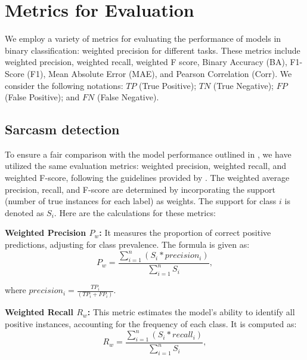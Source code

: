 \documentclass{article} %
\begin{document}

\section{Metrics for Evaluation}
We employ a variety of metrics for evaluating the performance of models in binary classification: weighted precision for different tasks. These metrics include weighted precision, weighted recall, weighted F score, Binary Accuracy (BA), F1-Score (F1), Mean Absolute Error (MAE), and Pearson Correlation (Corr). We consider the following notations: $TP$ (True Positive); $TN$ (True Negative); $FP$ (False Positive); and $FN$ (False Negative).


\subsection{Sarcasm detection}
To ensure a fair comparison with the model performance outlined in \citep{castro2019towards}, we have utilized the same evaluation metrics: weighted precision, weighted recall, and weighted F-score, following the guidelines provided by \citep{castro2019towards}. The weighted average precision, recall, and F-score are determined by incorporating the support (number of true instances for each label) as weights. The support for class $i$ is denoted as $S_i$. Here are the calculations for these metrics:

\textbf{Weighted Precision $P_w$:}  It measures the proportion of correct positive predictions, adjusting for class prevalence. The formula is given as: 
\begin{equation}
P_w = \frac{\sum_{i=1}^{n} (S_i * precision_i)}{\sum_{i=1}^{n} S_i}, \label{Pw}
\end{equation}

where $precision_i = \frac{TP_i}{(TP_i + FP_i)}$.

\textbf{Weighted Recall $R_w$:} This metric estimates the model's ability to identify all positive instances, accounting for the frequency of each class. It is computed as: 
\begin{equation}
R_w = \frac{\sum_{i=1}^{n} (S_i * recall_i)}{\sum_{i=1}^{n} S_i}, \label{Rw}
\end{equation}
\end{document}
